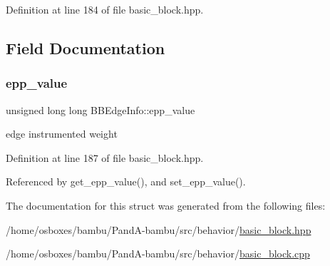 Definition at line 184 of file basic\+\_\+block.\+hpp.



\subsection{Field Documentation}
\mbox{\label{structBBEdgeInfo_a3cf14088ed9c7f8d05f1729ac24dc15f}} 
\subsubsection{\texorpdfstring{epp\+\_\+value}{epp\_value}}
{\footnotesize\ttfamily unsigned long long B\+B\+Edge\+Info\+::epp\+\_\+value\hspace{0.3cm}{\ttfamily [private]}}



edge instrumented weight 



Definition at line 187 of file basic\+\_\+block.\+hpp.



Referenced by get\+\_\+epp\+\_\+value(), and set\+\_\+epp\+\_\+value().



The documentation for this struct was generated from the following files\+:\begin{DoxyCompactItemize}
\item 
/home/osboxes/bambu/\+Pand\+A-\/bambu/src/behavior/\hyperlink{basic__block_8hpp}{basic\+\_\+block.\+hpp}\item 
/home/osboxes/bambu/\+Pand\+A-\/bambu/src/behavior/\hyperlink{basic__block_8cpp}{basic\+\_\+block.\+cpp}\end{DoxyCompactItemize}
